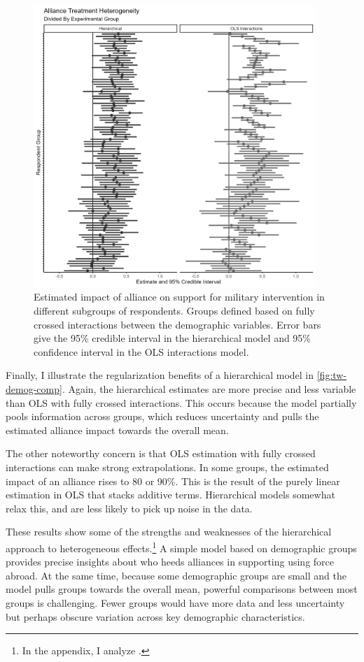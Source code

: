 \documentclass[12pt]{article}
\begin{document}
\begin{figure}[htpb]
	\centering
		\includegraphics[width=0.95\textwidth]{../figures/tw-treat-het-comp.png}
	\caption{Estimated impact of alliance on support for military intervention in different subgroups of respondents. Groups defined based on fully crossed interactions between the demographic variables. Error bars give the 95\% credible interval in the hierarchical model and 95\% confidence interval in the OLS interactions model.}
	\label{fig:tw-demog-comp}
\end{figure}


Finally, I illustrate the regularization benefits of a hierarchical model in \autoref{fig:tw-demog-comp}.
Again, the hierarchical estimates are more precise and less variable than OLS with fully crossed interactions. 
This occurs because the model partially pools information across groups, which reduces uncertainty and pulls the estimated alliance impact towards the overall mean.


The other noteworthy concern is that OLS estimation with fully crossed interactions can make strong extrapolations.
In some groups, the estimated impact of an alliance rises to 80 or 90\%. 
This is the result of the purely linear estimation in OLS that stacks additive terms.
Hierarchical models somewhat relax this, and are less likely to pick up noise in the data.


These results show some of the strengths and weaknesses of the hierarchical approach to heterogeneous effects.\footnote{In the appendix, I analyze \citet{BushPrather2020}.}
A simple model based on demographic groups provides precise insights about who heeds alliances in supporting using force abroad. 
At the same time, because some demographic groups are small and the model pulls groups towards the overall mean, powerful comparisons between most groups is challenging. 
Fewer groups would have more data and less uncertainty but perhaps obscure variation across key demographic characteristics. 
\end{document}
